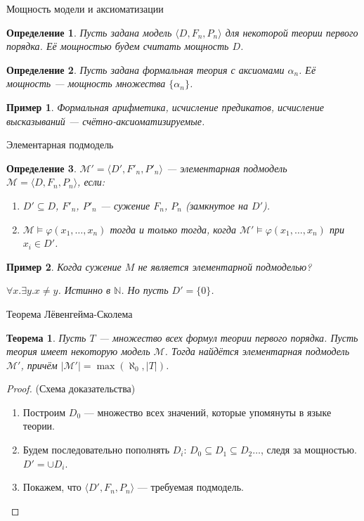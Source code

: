 \documentclass[aspectratio=169]{beamer}
\newtheorem{thm}{Теорема}[section]
\newtheorem{dfn}{Определение}[section]
\newtheorem{exm}{Пример}[section]
\begin{document}
\begin{frame}{Мощность модели и аксиоматизации}
\begin{dfn} Пусть задана модель $\langle D, F_n, P_n \rangle$ для некоторой теории первого порядка. 
Её мощностью будем считать мощность $D$.
\end{dfn}\pause

\begin{dfn} Пусть задана формальная теория с аксиомами $\alpha_n$. Её мощность --- мощность множества $\{\alpha_n\}$.
\end{dfn}\pause

\begin{exm} Формальная арифметика, исчисление предикатов, исчисление высказываний --- счётно-аксиоматизируемые.
\end{exm}
\end{frame}

\begin{frame}{Элементарная подмодель}
\begin{dfn}$\mathcal{M}' = \langle D', F'_n, P'_n \rangle$ --- элементарная подмодель $\mathcal{M} = \langle D, F_n, P_n \rangle$, 
если: \pause
\begin{enumerate}
\item $D' \subseteq D$, \pause $F'_n$, $P'_n$ --- сужение $F_n$, $P_n$ (замкнутое на $D'$). \pause
\item $\mathcal{M}\models \varphi(x_1,\dots,x_n)$ тогда и только тогда, когда $\mathcal{M}'\models \varphi(x_1,\dots,x_n)$
при $x_i \in D'$. \pause
\end{enumerate}
\end{dfn}

\begin{exm}Когда сужение $M$ не является элементарной подмоделью? \pause

$\forall x.\exists y.x \ne y$. Истинно в $\mathbb{N}$. \pause Но пусть $D' = \{ 0 \}$.
\end{exm}
\end{frame}

\begin{frame}{Теорема Лёвенгейма-Сколема}
\begin{thm}Пусть $T$ --- множество всех формул теории первого порядка. 
Пусть теория имеет некоторую модель $\mathcal{M}$.
Тогда найдётся элементарная подмодель $\mathcal{M'}$, причём $|\mathcal{M'}| = \max(\aleph_0, |T|)$.
\end{thm}\pause

\begin{proof} (Схема доказательства)
\begin{enumerate} 
\item Построим $D_0$ --- множество всех значений, которые упомянуты в языке теории. \pause
\item Будем последовательно пополнять $D_i$: $D_0 \subseteq D_1 \subseteq D_2 \dots$, следя за мощностью.
$D' = \cup D_i$.
\item Покажем, что $\langle D', F_n, P_n\rangle$ --- требуемая подмодель.
\end{enumerate}
\end{proof}
\end{frame}
\end{document}
